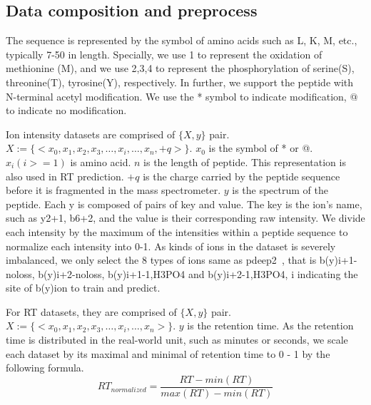 
\subsection{Data composition and preprocess}
The sequence is represented by the symbol of amino acids such as L, K, M, etc., typically 7-50 in length. Specially, we use 1 to represent the oxidation of methionine (M), and we use 2,3,4 to represent the phosphorylation of serine(S), threonine(T), tyrosine(Y), respectively. In further, we support the peptide with N-terminal acetyl modification. We use the * symbol to indicate modification, @ to indicate no modification. 

Ion intensity datasets are comprised of $\{X, y\}$ pair. 
$X := \{ <x_0, x_1, x_2, x_3,\dots, x_i, \dots, x_n, +q> \}$. $x_0$ is the symbol of * or @. 
$x_i (i>= 1)$ is amino acid. $n$ is the length of peptide. This representation is also used in RT prediction. $+q$ is the charge carried by the peptide sequence before it is fragmented in the mass spectrometer. \( y \) is the spectrum of the peptide. Each y is composed of pairs of key and value.
The key is the ion's name, such as y2+1, b6+2, and the value is their corresponding raw intensity.
We divide each intensity by the maximum of the intensities within a peptide sequence to normalize each intensity into 0-1. As kinds of ions in the dataset is severely imbalanced, we only select the 8 types of ions same as pdeep2~\cite{zeng2019ms}, that is b(y)i+1-noloss, b(y)i+2-noloss, b(y)i+1-1,H3PO4 and b(y)i+2-1,H3PO4, i indicating the site of b(y)ion to train and predict. 

For RT datasets, they are comprised of \( \{X, y\} \) pair. 
$X:= \{ <x_0, x_1, x_2, x_3,\dots, x_i, \dots, x_n>\}$. \( y \) is the retention time. 
As the retention time is distributed in the real-world unit, such as minutes or seconds, we scale each dataset by its maximal and minimal of retention time to 0 - 1 by the following formula. 
\[RT_{normalized} = \frac{RT-min(RT)}{max(RT)-min(RT)}\]






